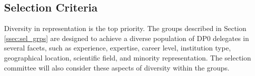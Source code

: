 \documentclass[DM,lsstdraft,authoryear,toc]{lsstdoc}
\begin{document}



\subsection{Selection Criteria}\label{ssec:sel_crit}

Diversity in representation is the top priority.
The groups described in Section \ref{ssec:sel_grps} are designed to achieve a diverse population of DP0 delegates in several facets, such as experience, expertise, career level, institution type, geographical location, scientific field, and minority representation.
The selection committee will also consider these aspects of diversity within the groups.
\end{document}
